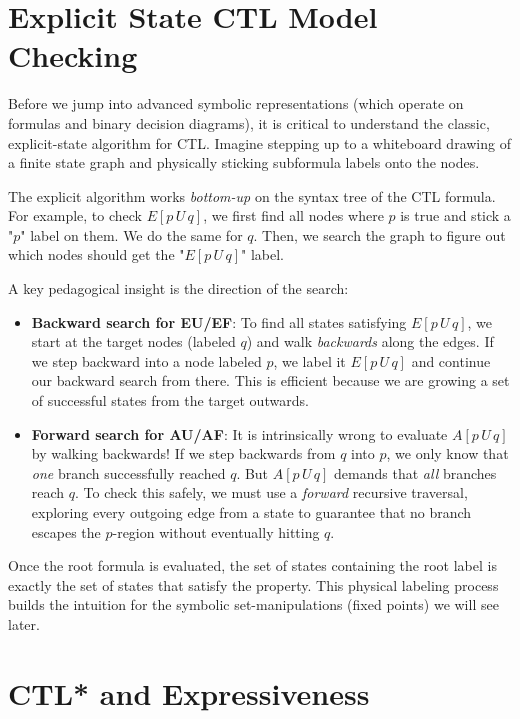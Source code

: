 \section{Explicit State CTL Model Checking}
\label{sec:ctl-explicit}

Before we jump into advanced symbolic representations (which operate on formulas and binary decision diagrams), it is critical to understand the classic, explicit-state algorithm for CTL. Imagine stepping up to a whiteboard drawing of a finite state graph and physically sticking subformula labels onto the nodes.

The explicit algorithm works \emph{bottom-up} on the syntax tree of the CTL formula.
For example, to check $E[p\,U\,q]$, we first find all nodes where $p$ is true and stick a "$p$" label on them. We do the same for $q$. Then, we search the graph to figure out which nodes should get the "$E[p\,U\,q]$" label.

A key pedagogical insight is the direction of the search:
\begin{itemize}
    \item \textbf{Backward search for EU/EF}: To find all states satisfying $E[p\,U\,q]$, we start at the target nodes (labeled $q$) and walk \emph{backwards} along the edges. If we step backward into a node labeled $p$, we label it $E[p\,U\,q]$ and continue our backward search from there. This is efficient because we are growing a set of successful states from the target outwards.
    \item \textbf{Forward search for AU/AF}: It is intrinsically wrong to evaluate $A[p\,U\,q]$ by walking backwards! If we step backwards from $q$ into $p$, we only know that \emph{one} branch successfully reached $q$. But $A[p\,U\,q]$ demands that \emph{all} branches reach $q$. To check this safely, we must use a \emph{forward} recursive traversal, exploring every outgoing edge from a state to guarantee that no branch escapes the $p$-region without eventually hitting $q$.
\end{itemize}

Once the root formula is evaluated, the set of states containing the root label is exactly the set of states that satisfy the property. This physical labeling process builds the intuition for the symbolic set-manipulations (fixed points) we will see later.

\section{CTL* and Expressiveness}
\label{sec:ctlstar-expressiveness}

